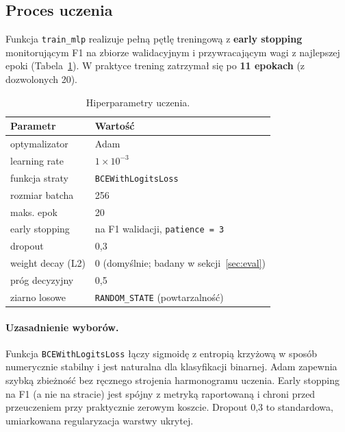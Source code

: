 \subsection{Proces uczenia}

Funkcja \texttt{train\_mlp} realizuje pełną pętlę treningową z \textbf{early
stopping} monitorującym F1 na zbiorze walidacyjnym i przywracającym wagi z najlepszej
epoki (Tabela~\ref{tab:train}). W praktyce trening zatrzymał się po \textbf{11
epokach} (z dozwolonych 20).

\begin{table}[H]
  \centering
  \caption{Hiperparametry uczenia.}
  \label{tab:train}
  \begin{tabular}{ll}
    \toprule
    \textbf{Parametr} & \textbf{Wartość} \\
    \midrule
    optymalizator        & Adam \\
    learning rate        & $1\times10^{-3}$ \\
    funkcja straty       & \texttt{BCEWithLogitsLoss} \\
    rozmiar batcha        & 256 \\
    maks. epok           & 20 \\
    early stopping       & na F1 walidacji, \texttt{patience = 3} \\
    dropout              & 0{,}3 \\
    weight decay (L2)    & 0 (domyślnie; badany w sekcji~\ref{sec:eval}) \\
    próg decyzyjny       & 0{,}5 \\
    ziarno losowe        & \texttt{RANDOM\_STATE} (powtarzalność) \\
    \bottomrule
  \end{tabular}
\end{table}

\paragraph{Uzasadnienie wyborów.}
Funkcja \texttt{BCEWithLogitsLoss} łączy sigmoidę z entropią krzyżową w sposób
numerycznie stabilny i jest naturalna dla klasyfikacji binarnej. Adam zapewnia szybką
zbieżność bez ręcznego strojenia harmonogramu uczenia. Early stopping na F1 (a nie na
stracie) jest spójny z metryką raportowaną i chroni przed przeuczeniem przy
praktycznie zerowym koszcie. Dropout 0{,}3 to standardowa, umiarkowana regularyzacja
warstwy ukrytej.
